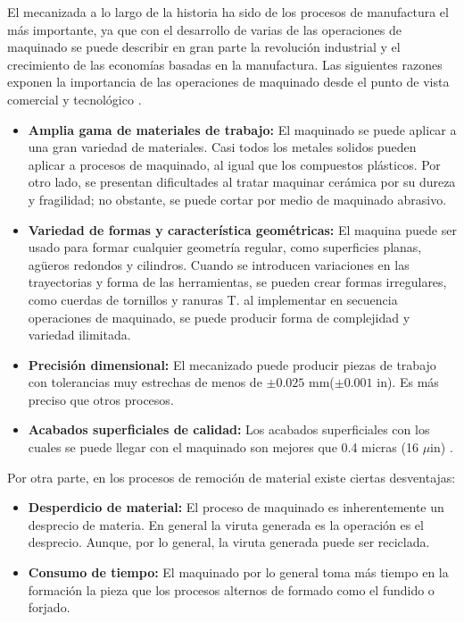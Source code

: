 El mecanizada a lo largo de la historia ha sido de los procesos de manufactura el más importante, ya que con el desarrollo de varias de las operaciones de maquinado se puede describir en gran parte la revolución industrial y el crecimiento de las economías basadas en la manufactura. Las siguientes razones exponen la importancia de las operaciones de maquinado desde el punto de vista comercial y tecnológico  \citep{groover2007fundamentals}.\\
\begin{itemize}
\item \textbf{Amplia gama de materiales de trabajo:} El maquinado se puede aplicar a una gran variedad de materiales. Casi todos los metales solidos pueden aplicar a procesos de maquinado, al igual que los compuestos plásticos. Por otro lado, se presentan dificultades al tratar maquinar cerámica por su dureza y fragilidad; no obstante, se puede cortar por medio de maquinado abrasivo\citep{groover2007fundamentals}.

\item\textbf{Variedad de formas y característica geométricas:} El maquina puede ser usado para formar cualquier geometría regular, como superficies planas, agüeros redondos y cilindros. Cuando se introducen variaciones en las trayectorias y forma de las herramientas, se pueden crear formas irregulares, como cuerdas de tornillos y ranuras T.  al implementar en secuencia operaciones de maquinado, se puede producir forma de complejidad y variedad ilimitada\citep{groover2007fundamentals}.

\item\textbf{Precisión dimensional:} El mecanizado puede producir piezas de trabajo con tolerancias muy estrechas de menos de $\pm 0.025$ mm($\pm 0.001$ in). Es más preciso que otros procesos\citep{groover2007fundamentals}.%
\item\textbf{Acabados superficiales de calidad:} Los acabados superficiales con los cuales se puede llegar con el maquinado son mejores que 0.4 micras (16 $\mu$in) \citep{groover2007fundamentals}.
\end{itemize}

Por otra parte, en los procesos de remoción de material existe ciertas desventajas:
\begin{itemize}
    \item \textbf{Desperdicio de material:} El proceso de maquinado es inherentemente un desprecio de materia. En general la viruta generada es la operación es el desprecio. Aunque, por lo general, la viruta generada puede ser reciclada\citep{groover2007fundamentals}.
    \item \textbf{Consumo de tiempo:} El maquinado por lo general toma más tiempo en la formación la pieza que los procesos alternos de formado como el fundido o forjado\citep{groover2007fundamentals}.
\end{itemize}

